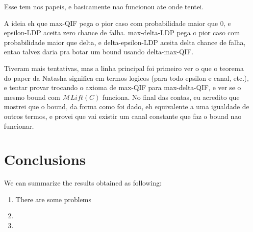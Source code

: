 \documentclass[conference]{IEEEtran}
\begin{document}
{\color{red} Esse tem nos papeis, e basicamente nao funcionou ate onde tentei.}

{\color{red} A ideia eh que max-QIF pega o pior caso com probabilidade maior que 0, e epsilon-LDP aceita zero chance de falha. max-delta-LDP pega o pior caso com probabilidade maior que delta, e delta-epsilon-LDP aceita delta chance de falha, entao talvez daria pra botar um bound usando delta-max-QIF.}

{\color{red} Tiveram mais tentativas, mas a linha principal foi primeiro ver o que o teorema do paper da Natasha significa em termos logicos (para todo epsilon e canal, etc.), e tentar provar trocando o axioma de max-QIF para max-delta-QIF, e ver se o mesmo bound com $\mathcal{M}Lift(C)$ funciona. No final das contas, eu acredito que mostrei que o bound, da forma como foi dado, eh equivalente a uma igualdade de outros termos, e provei que vai existir um canal constante que faz o bound nao funcionar.}

\section{Conclusions}

We can summarize the results obtained as following:

\begin{enumerate}
	\item There are some problems
	\item
	\item
\end{enumerate}



\end{document}
